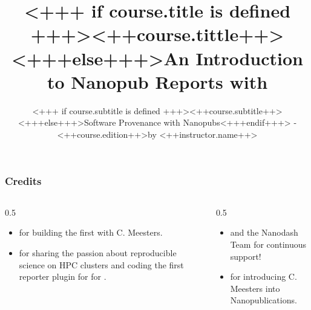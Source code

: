 \documentclass[english,xcolor=pdftex,dvipsnames,aspectratio=<+++ if course.aspectratio is defined +++><++course.aspectratio++><+++else+++>43<+++endif+++>]{beamer}
\title[<++course.shorttitle++>]{<+++ if course.title is defined +++><++course.tittle++><+++else+++>An Introduction to Nanopub Reports with \Snakemake<+++endif+++>}
\subtitle{<+++ if course.subtitle is defined +++><++course.subtitle++><+++else+++>Software Provenance with Nanopubs<+++endif+++> - <++course.edition++>\newline by <++instructor.name++>}
\begin{document}

\sloppy

\begin{frame}[plain] %
  \titlepage
\end{frame}









\begin{frame}
    \frametitle{Credits}
    \begin{columns}
        \begin{column}{0.5\textwidth}
            \begin{itemize}
                \item {} for building the first  with C. Meesters.
                \item {} for sharing the passion about reproducible science on HPC clusters and coding the first reporter plugin for \Snakemake for .
            \end{itemize}
        \end{column}
        \begin{column}{0.5\textwidth}
            \begin{itemize}
                \item {} and the Nanodash Team for continuous support!
                 \item {} for introducing C. Meesters into Nanopublications.
            \end{itemize}
        \end{column}
    \end{columns}    
\end{frame}
\end{document}
